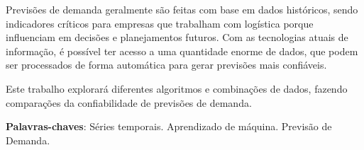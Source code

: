 
\setlength{\absparsep}{18pt} %
\begin{resumo}
Previsões de demanda geralmente são feitas com base em dados históricos, sendo indicadores críticos para empresas que trabalham com logística porque influenciam em decisões e planejamentos futuros. Com as tecnologias atuais de informação, é possível ter acesso a uma quantidade enorme de dados, que podem ser processados de forma automática para gerar previsões mais confiáveis.

Este trabalho explorará diferentes algoritmos e combinações de dados, fazendo comparações da confiabilidade de previsões de demanda.

  \textbf{Palavras-chaves}: Séries temporais. Aprendizado de máquina. Previsão de Demanda.
\end{resumo}

\begin{comment}
\begin{resumo}[Abstract]
  \begin{otherlanguage*}{english}
    Due to the great advances in the field of computer vision, many tools related to this subject have been created, but it has become complex to choose which one is ideal for the existing needs and how they can be applied. In order to understand better the options available and their applications, this paper presents a study on the performance of two different face detection algorithms and the analysis of how feasible is to apply them in a commercial project. The Viola-Jones method of characteristic analysis and a Multi-Task Cascaded Convolutional Neural Network (MTCNN) were studied and their performances were measured using a set of manually selected images according to a list of established rules. The analysis of the results was made according to the accuracy obtained and the profit generated in a hypothetical situation of a company that needs to validate registration photos. It was demonstrated that Viola-Jones method can obtain profitable result and with accuracy of 93,6\%, while the MTCNN method can obtain the most profitable result with accuracy of 94,2\%. After the analysis, it was possible to determine that it is commercially interesting to implement computer vision models, but it is necessary to dedicate efforts to adapt the tools to the specific objectives of each case.

    \vspace{\onelineskip}

    \noindent
    \textbf{Keywords}: Machine Learning. Face Detection. Computer Vision.
  \end{otherlanguage*}
\end{resumo}
\end{comment}